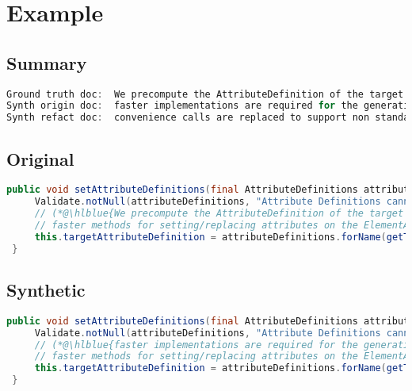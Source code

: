 \documentclass[11pt]{article}
\DeclareRobustCommand{\hlblue}[1]{{\sethlcolor{SeaGreen}\hl{#1}}}
\DeclareRobustCommand{\hlblue}[1]{{\sethlcolor{SkyBlue}\hl{#1}}}
\begin{document}

\pagebreak
\section{Example}
\subsection{Summary}

\begin{lstlisting}[language=java]
Ground truth doc:  We precompute the AttributeDefinition of the target attribute in order to being able to use much
Synth origin doc:  faster implementations are required for the generation but cannot override or replace attributes instead of just
Synth refact doc:  convenience calls are replaced to support non standard methods but with only support on standard objects
\end{lstlisting}

\subsection{Original}
\begin{lstlisting}[language=java]
 public void setAttributeDefinitions(final AttributeDefinitions attributeDefinitions) {
     Validate.notNull(attributeDefinitions, "Attribute Definitions cannot be null");
     // (*@\hlblue{We precompute the AttributeDefinition of the target attribute in order to being able to use much}@*)
     // faster methods for setting/replacing attributes on the ElementAttributes implementation
     this.targetAttributeDefinition = attributeDefinitions.forName(getTemplateMode(), this.targetAttrCompleteName);
 }
\end{lstlisting}
\subsection{Synthetic}

\begin{lstlisting}[language=java]
 public void setAttributeDefinitions(final AttributeDefinitions attributeDefinitions) {
     Validate.notNull(attributeDefinitions, "Attribute Definitions cannot be null");
     // (*@\hlblue{faster implementations are required for the generation but cannot override or replace attributes instead of just}@*)
     // faster methods for setting/replacing attributes on the ElementAttributes implementation
     this.targetAttributeDefinition = attributeDefinitions.forName(getTemplateMode(), this.targetAttrCompleteName);
 }
\end{lstlisting}
\end{document}
